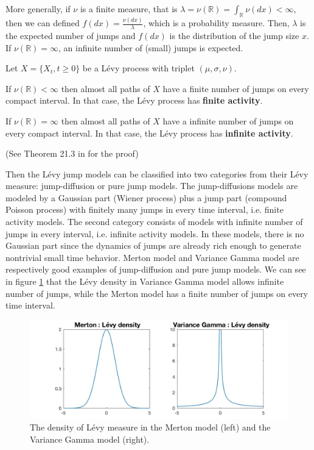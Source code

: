 More generally, if $\nu$ is a finite measure, that is $\lambda = \nu(\mathbb{R}) =\int_\mathbb{R}\nu(dx) <\infty$, 
then we can defined $f(dx) = \frac{\nu(dx)}{\lambda}$, which is a probability measure. Then, $\lambda$ is the expected number of jumps and $f(dx)$ is the distribution of the jump size $x$. If $\nu(\mathbb{R}) = \infty$, an infinite number of (small) jumps is expected.

\begin{prop}
Let $X =\{X_t,t\geq 0\}$ be a L\'evy process with triplet $(\mu,\sigma,\nu)$.
\begin{my_list}
\item If $\nu(\mathbb{R})<\infty$ then almost all paths of $X$ have a finite number of jumps on every compact interval. In that case, the L\'evy process has \textbf{finite activity}.
\item If $\nu(\mathbb{R})=\infty$ then almost all paths of $X$ have a infinite number of jumps on every compact interval. In that case, the L\'evy process has \textbf{infinite activity}.
\end{my_list}
(See Theorem 21.3 in \citeauthor{Sat99} \citeyearpar{Sat99} for the proof)
\end{prop}

Then the L\'evy jump models can be classified into two categories from their L\'evy measure: jump-diffusion or pure jump models. The jump-diffusions models are modeled by a Gaussian part (Wiener process) plus a jump part (compound Poisson process) with finitely many jumps in every time interval, i.e. finite activity models. The second category consists of models with infinite number of jumps in every interval, i.e. infinite activity models. In these models, there is no Gaussian part since the dynamics of jumps are already rich enough to generate nontrivial small time behavior. Merton model and Variance Gamma model are respectively good examples of jump-diffusion and pure jump models. We can see in figure \ref{fig:Levy:densities} that the L\'evy density in Variance Gamma model allows infinite number of jumps, while the Merton model has a finite number of jumps on every time interval.

\begin{figure}[!htb]
	\includegraphics[width=\textwidth]{gfx/Levy_densities}
	\caption{The density of L\'evy measure in the Merton model (left) and the Variance Gamma model (right).}
	\label{fig:Levy:densities}
\end{figure}

